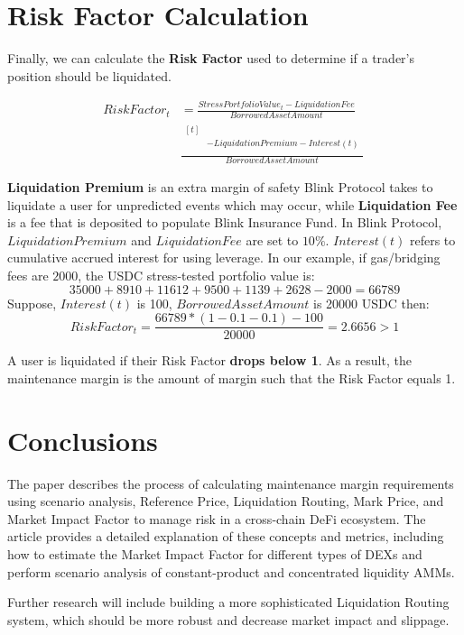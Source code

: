 \documentclass[conference]{IEEEtran}
\begin{document}
 \section{Risk Factor Calculation}
 Finally, we can calculate the \textbf{Risk Factor} used to determine if a trader’s position should be liquidated. 
 
\begin{align}
RiskFactor_{t} &= \frac{StressPortfolioValue_{t}-LiquidationFee}{BorrowedAssetAmount} \nonumber \\
& \frac{\begin{aligned}[t] \\
  &-LiquidationPremium - Interest(t) \\
  \end{aligned}}{BorrowedAssetAmount} \nonumber \
\end{align}
 
 \textbf{Liquidation Premium} is an extra margin of safety Blink Protocol takes to liquidate a user for unpredicted events which may occur, while \textbf{Liquidation Fee} is a fee that is deposited to populate Blink Insurance Fund. In Blink Protocol, $LiquidationPremium$ and $LiquidationFee$ are set to $10\%$. $Interest(t)$ refers to cumulative accrued interest for using leverage. In our example, if gas/bridging fees are $2000$, the USDC stress-tested portfolio value is: 
 $$35000 + 8910 + 11612 + 9500 + 1139 + 2628 - 2000 = 66789$$
Suppose, $Interest(t)$ is 100, $BorrowedAssetAmount$ is 20000 USDC then:
$$RiskFactor_{t}=\frac{66789*(1-0.1-0.1)-100}{20000}=2.6656>1$$

A user is liquidated if their Risk Factor \textbf{drops below 1}. As a result, the maintenance margin is the amount of margin such that the Risk Factor equals 1.

\section{Conclusions}
The paper describes the process of calculating maintenance margin requirements using scenario analysis, Reference Price, Liquidation Routing, Mark Price, and Market Impact Factor to manage risk in a cross-chain DeFi ecosystem. The article provides a detailed explanation of these concepts and metrics, including how to estimate the Market Impact Factor for different types of DEXs and perform scenario analysis of constant-product and concentrated liquidity AMMs. 

Further research will include building a more sophisticated Liquidation Routing system, which should be more robust and decrease market impact and slippage.
\end{document}
